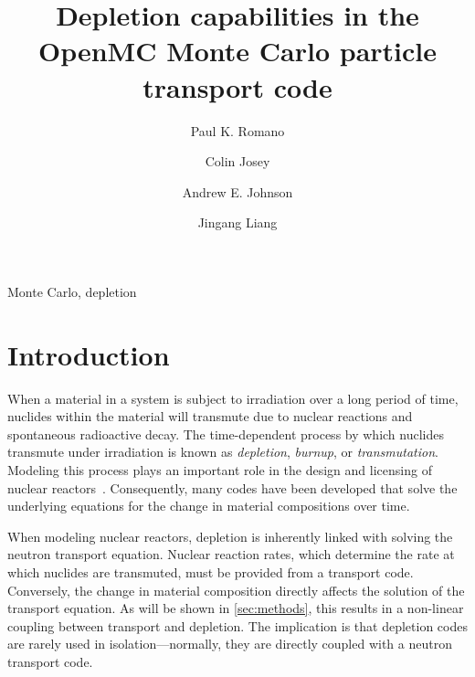 \documentclass[3p,authoryear]{elsarticle}
\begin{document}
\title{Depletion capabilities in the OpenMC Monte Carlo particle transport code}

\author[anl]{Paul K. Romano}

\author[lanl]{Colin Josey}

\author[gatech]{Andrew E. Johnson}

\author[tsinghua]{Jingang Liang}

\address[anl]{Argonne National Laboratory, 9700 S. Cass Ave, Lemont, IL 60439, United States}
\address[lanl]{Los Alamos National Laboratory, P.O. Box 1663, Los Alamos, NM 87545, United States}
\address[gatech]{Georgia Institute of Technology, 770 State St NW, Atlanta, GA 30318, United States}
\address[tsinghua]{Institute of Nuclear and New Energy Technology, Tsinghua University, Beijing, China}

\begin{abstract}

\end{abstract}

\begin{keyword}
  Monte Carlo, depletion
\end{keyword}

\maketitle

\section{Introduction}

When a material in a system is subject to irradiation over a long period of
time, nuclides within the material will transmute due to nuclear reactions and
spontaneous radioactive decay. The time-dependent process by which nuclides
transmute under irradiation is known as \emph{depletion}, \emph{burnup}, or
\emph{transmutation}. Modeling this process plays an important role in the
design and licensing of nuclear reactors~\citep{betzler2019ned}. Consequently,
many codes have been developed that solve the underlying equations for the
change in material compositions over time.

When modeling nuclear reactors, depletion is inherently linked with solving the
neutron transport equation. Nuclear reaction rates, which determine the rate at
which nuclides are transmuted, must be provided from a transport code.
Conversely, the change in material composition directly affects the solution of
the transport equation. As will be shown in \cref{sec:methods}, this results in
a non-linear coupling between transport and depletion. The implication is that
depletion codes are rarely used in isolation---normally, they are directly
coupled with a neutron transport code.
\end{document}
